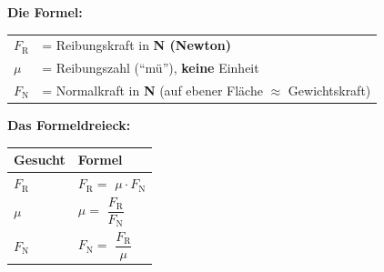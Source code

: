 \documentclass[11pt,a4paper]{article}
\newcommand{\lsg}[1]{\textcolor{loesung}{\textbf{#1}}}
\begin{document}
\begin{merkebox}[title=K1: Das Formeldreieck -- Reibungskraft berechnen]
\small
\textbf{Die Formel:} 

\vspace{0.3em}
\renewcommand{\arraystretch}{1.2}
\begin{tabular}{ll}
$F_\text{R}$ & = Reibungskraft in \lsg{N (Newton)} \\
$\mu$ & = Reibungszahl (``mü''), \lsg{keine} Einheit \\
$F_\text{N}$ & = Normalkraft in \lsg{N} (auf ebener Fläche $\approx$ Gewichtskraft) \\
\end{tabular}

\vspace{0.4em}
\textbf{Das Formeldreieck:}

\vspace{0.3em}
\begin{minipage}{0.35\textwidth}
\centering
{}
\end{minipage}
\hfill
\begin{minipage}{0.60\textwidth}
\renewcommand{\arraystretch}{1.4}
\begin{tabular}{|p{2cm}|p{5cm}|}
\hline
\textbf{Gesucht} & \textbf{Formel} \\
\hline
$F_\text{R}$ & $F_\text{R} =$ \lsg{$\mu \cdot F_\text{N}$} \\
\hline
$\mu$ & $\mu =$ \lsg{$\dfrac{F_\text{R}}{F_\text{N}}$} \\
\hline
$F_\text{N}$ & $F_\text{N} =$ \lsg{$\dfrac{F_\text{R}}{\mu}$} \\
\hline
\end{tabular}
\end{minipage}
\end{merkebox}

\vspace{0.3em}
\end{document}
